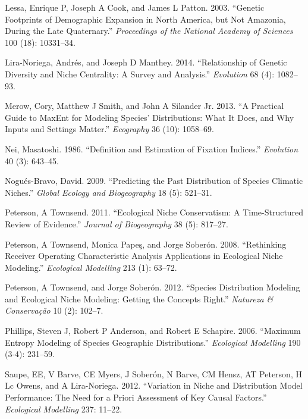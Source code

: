 \documentclass[
]{article}
\newlength{\cslhangindent}
\newlength{\cslentryspacingunit} %
\newenvironment{CSLReferences}[2] %
 {%
  \setlength{\parindent}{0pt}
  \ifodd #1
  \let\oldpar\par
  \def\par{\hangindent=\cslhangindent\oldpar}
  \fi
  \setlength{\parskip}{#2\cslentryspacingunit}
 }%
 {}
\begin{document}
\begin{CSLReferences}{1}{0}
\leavevmode{}%
Lessa, Enrique P, Joseph A Cook, and James L Patton. 2003. {``Genetic
Footprints of Demographic Expansion in North America, but Not Amazonia,
During the Late Quaternary.''} \emph{Proceedings of the National Academy
of Sciences} 100 (18): 10331--34.

\leavevmode{}%
Lira-Noriega, Andrés, and Joseph D Manthey. 2014. {``Relationship of
Genetic Diversity and Niche Centrality: A Survey and Analysis.''}
\emph{Evolution} 68 (4): 1082--93.

\leavevmode{}%
Merow, Cory, Matthew J Smith, and John A Silander Jr. 2013. {``A
Practical Guide to MaxEnt for Modeling Species' Distributions: What It
Does, and Why Inputs and Settings Matter.''} \emph{Ecography} 36 (10):
1058--69.

\leavevmode{}%
Nei, Masatoshi. 1986. {``Definition and Estimation of Fixation
Indices.''} \emph{Evolution} 40 (3): 643--45.

\leavevmode{}%
Nogués-Bravo, David. 2009. {``Predicting the Past Distribution of
Species Climatic Niches.''} \emph{Global Ecology and Biogeography} 18
(5): 521--31.

\leavevmode{}%
Peterson, A Townsend. 2011. {``Ecological Niche Conservatism: A
Time-Structured Review of Evidence.''} \emph{Journal of Biogeography} 38
(5): 817--27.

\leavevmode{}%
Peterson, A Townsend, Monica Papeş, and Jorge Soberón. 2008.
{``Rethinking Receiver Operating Characteristic Analysis Applications in
Ecological Niche Modeling.''} \emph{Ecological Modelling} 213 (1):
63--72.

\leavevmode{}%
Peterson, A Townsend, and Jorge Soberón. 2012. {``Species Distribution
Modeling and Ecological Niche Modeling: Getting the Concepts Right.''}
\emph{Natureza \& Conserva{ç}{ã}o} 10 (2): 102--7.

\leavevmode{}%
Phillips, Steven J, Robert P Anderson, and Robert E Schapire. 2006.
{``Maximum Entropy Modeling of Species Geographic Distributions.''}
\emph{Ecological Modelling} 190 (3-4): 231--59.

\leavevmode{}%
Saupe, EE, V Barve, CE Myers, J Soberón, N Barve, CM Hensz, AT Peterson,
H Lc Owens, and A Lira-Noriega. 2012. {``Variation in Niche and
Distribution Model Performance: The Need for a Priori Assessment of Key
Causal Factors.''} \emph{Ecological Modelling} 237: 11--22.


\end{CSLReferences}
\end{document}
